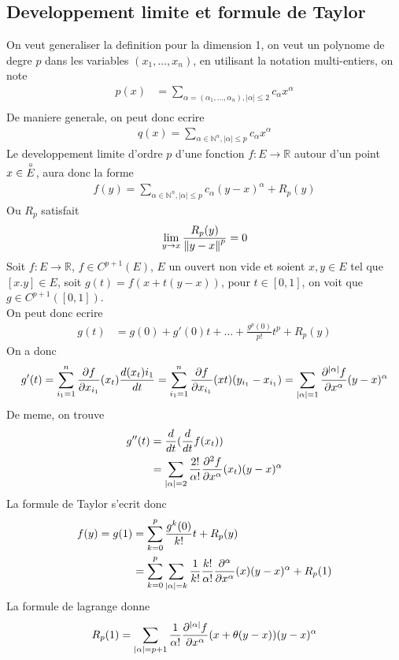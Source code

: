\documentclass[../main.tex]{subfiles}
\begin{document}
\subsection{Developpement limite et formule de Taylor}
On veut generaliser la definition pour la dimension 1, on veut un polynome de degre $p$ dans les variables $( x_1, \ldots, x_n) $, en utilisant la notation multi-entiers, on note
\begin{align*}
	p( x) &= \sum_{\alpha =  ( \alpha_1, \ldots,\alpha_n),|\alpha|\leq 2 }  c_{\alpha} x^{\alpha}\\
\end{align*}
De maniere generale, on peut donc ecrire
\begin{align*}
	q( x) = \sum_{\alpha \in \mathbb{N}^{n},|\alpha| \leq p} c_{\alpha} x^{\alpha}
\end{align*}
Le developpement limite d'ordre $p$ d'une fonction
$f: E \to \mathbb{R}$ autour d'un point $x \in \overset{\circ}{E}$, aura donc la forme
\begin{align*}
	f( y) = \sum_{\alpha \in \mathbb{N}^{n},|\alpha| \leq p} c_{\alpha} ( y-x) ^{\alpha} + R_p( y)
\end{align*}
Ou $R_p$ satisfait
\[ 
	\lim_{y \to x} \frac{R_p( y) }{\left\lVert y -x\right\rVert^{p}}=0
\]
Soit $f: E \to \mathbb{R}$, $f \in C^{p+1}( E)$, $E$ un ouvert non vide et soient $x,y \in E$ tel que $[x.y]\in E$, soit $g( t) = f( x+ t( y-x) ) $, pour $t \in [ 0,1] $, on voit que $g \in C^{p+1}( [ 0,1] ) $.\\
On peut donc ecrire
\begin{align*}
	g(t )  &= g( 0)  + g'( 0) t + \ldots + \frac{g^{p}( 0) }{p!}t^{p} + R_p( y) 
\end{align*}
On a donc
\begin{align*}
	g'( t) = \sum_{i_1=1}^{ n} \frac{\partial f}{\partial x_{i_1} }( x_t) \frac{d( x_t)i_1 }{dt} = \sum_{i_1=1}^{ n} \frac{\partial f}{\partial x_{i_1} }( xt) ( y_{i_1} - x_{i_1} ) = \sum_{|\alpha|=1} \frac{\partial ^{|\alpha|}f}{\partial x^{\alpha}}( y-x) ^{\alpha} \\
\end{align*}
De meme, on trouve
\begin{align*}
	g''( t)  &= \frac{d}{dt}(  \frac{d}{dt}f( x_t) ) \\
		 &= \sum_{|\alpha|=2} \frac{2!}{\alpha!} \frac{\partial^{2}f}{\partial x^{\alpha}}( x_t) ( y-x) ^{\alpha}
\end{align*}
La formule de Taylor s'ecrit donc
\begin{align*}
	f( y) = g( 1) &= \sum_{k=0}^{ p} \frac{g^{k}( 0) }{k!}t + R_p( y) \\
		      &= \sum_{k=0}^{ p} \sum_{|\alpha| =k} \frac{1}{k!} \frac{k!}{\alpha!} \frac{\partial ^{\alpha}}{\partial x^{\alpha}} ( x) ( y-x) ^{\alpha} + R_p( 1) 
\end{align*}
La formule de lagrange donne
\begin{align*}
	R_p ( 1) = \sum_{|\alpha| = p+1} \frac{1}{\alpha!} \frac{\partial ^{|\alpha| }f}{\partial x^{\alpha}} ( x + \theta ( y-x) ) ( y-x) ^{\alpha}
\end{align*}

 







    
\end{document}
